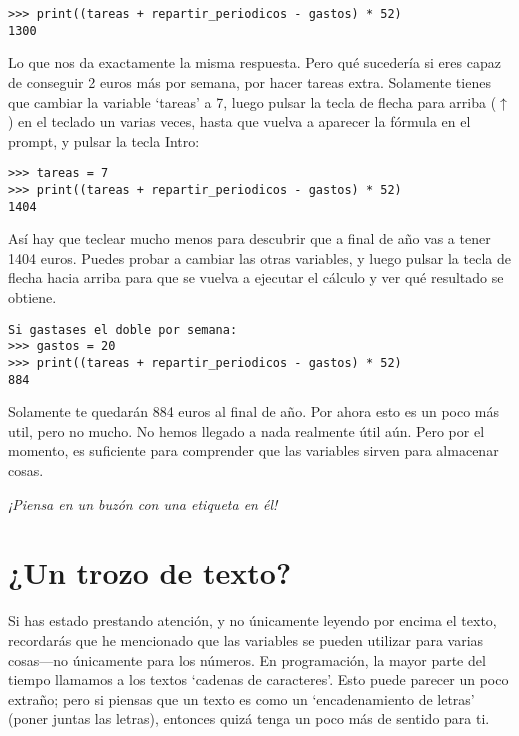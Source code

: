 \begin{listing}
\begin{verbatim}
>>> print((tareas + repartir_periodicos - gastos) * 52)
1300
\end{verbatim}
\end{listing}

Lo que nos da exactamente la misma respuesta. Pero qué sucedería si eres capaz de conseguir 2 euros más por semana, por hacer tareas extra.  Solamente tienes que cambiar la variable `tareas' a 7, luego pulsar la tecla de flecha para arriba ($\uparrow$) en el teclado un varias veces, hasta que vuelva a aparecer la fórmula en el prompt, y pulsar la tecla Intro:

\begin{listing}
\begin{verbatim}
>>> tareas = 7
>>> print((tareas + repartir_periodicos - gastos) * 52)
1404
\end{verbatim}
\end{listing}

Así hay que teclear mucho menos para descubrir que a final de año vas a tener 1404 euros. Puedes probar a cambiar las otras variables, y luego pulsar la tecla de flecha hacia arriba para que se vuelva a ejecutar el cálculo y ver qué resultado se obtiene.

\begin{listing}
\begin{verbatim}
Si gastases el doble por semana:
>>> gastos = 20
>>> print((tareas + repartir_periodicos - gastos) * 52)
884
\end{verbatim}
\end{listing}

Solamente te quedarán 884 euros al final de año. Por ahora esto es un poco más util, pero no mucho. No hemos llegado a nada realmente útil aún. Pero por el momento, es suficiente para comprender que las variables sirven para almacenar cosas.

\noindent
\emph{¡Piensa en un buzón con una etiqueta en él!}

\section{¿Un trozo de texto?}

Si has estado prestando atención, y no únicamente leyendo por encima el texto, recordarás que he mencionado que las variables se pueden utilizar para varias cosas---no únicamente para los números. En programación, la mayor parte del tiempo llamamos a los textos `cadenas de caracteres'. Esto puede parecer un poco extraño; pero si piensas que un texto es como un `encadenamiento de letras' (poner juntas las letras), entonces quizá tenga un poco más de sentido para ti.

